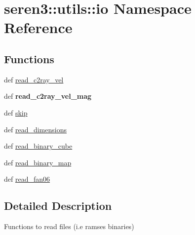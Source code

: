 \hypertarget{namespaceseren3_1_1utils_1_1io}{
\section{seren3::utils::io Namespace Reference}
\label{namespaceseren3_1_1utils_1_1io}
}
\subsection*{Functions}
\begin{DoxyCompactItemize}
\item 
def \hyperlink{namespaceseren3_1_1utils_1_1io_a00c3cdbfb36d9c2090f1ab760e1acddb}{read\_\-c2ray\_\-vel}
\item 
\hypertarget{namespaceseren3_1_1utils_1_1io_a172bbdf3d53414fd2f9a2d7bfc5df1c0}{
def {\bfseries read\_\-c2ray\_\-vel\_\-mag}}
\label{namespaceseren3_1_1utils_1_1io_a172bbdf3d53414fd2f9a2d7bfc5df1c0}

\item 
def \hyperlink{namespaceseren3_1_1utils_1_1io_a5adaef91712cb2ec5700083eddfed928}{skip}
\item 
def \hyperlink{namespaceseren3_1_1utils_1_1io_a1e51f115762ffa143326db50f5ddd329}{read\_\-dimensions}
\item 
def \hyperlink{namespaceseren3_1_1utils_1_1io_a37631863791c31ac718b62e18acb9083}{read\_\-binary\_\-cube}
\item 
def \hyperlink{namespaceseren3_1_1utils_1_1io_ad0a0bc5bc270cfe1dfad10eb50018501}{read\_\-binary\_\-map}
\item 
def \hyperlink{namespaceseren3_1_1utils_1_1io_a70538d01ca9d56833ff828f0dca3c0b7}{read\_\-fan06}
\end{DoxyCompactItemize}


\subsection{Detailed Description}
\begin{DoxyVerb}
Functions to read files (i.e ramses binaries)
\end{DoxyVerb}
 

